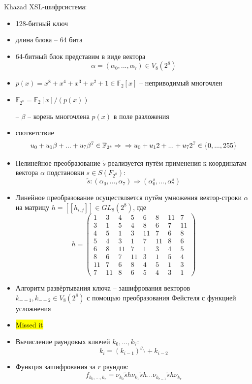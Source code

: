 \documentclass[a4paper,12pt]{article}
\begin{document}
  Khazad XSL-шифрсистема:
  \begin{itemize}
  \item 128-битный ключ
  \item длина блока -- 64 бита
  \end{itemize}
  \begin{itemize}
  \item 64-битный блок представим в виде вектора \[ \alpha = ( \alpha_0, ..., \alpha_7) \in V_8(2^8) \]
  \item $p(x) = x^8 + x^4 + x^3 + x^2 + 1 \in \mathbb{F}_2[x]$ -- неприводимый многочлен
  \item $\mathbb{F}_{2^8} = \mathbb{F}_2[x] / (p(x))$

    -- $\beta$ -- корень многочлена $p(x)$ в поле разложения
  \item соответствие
    \[ u_0 + u_1\beta + ... + u_7\beta^7 \in \mathbb{F}_{2^8} \Rightarrow \\
      \Rightarrow u_0 + u_1 2 + ... + u_7 2^7 \in \{0, ..., 255\} \]
  \item Нелинейное преобразование $\tilde{s}$ реализуется путём
    применения к координатам вектора $\alpha$ подстановки $s \in
    S(F_{2^8})$: \[ \tilde{s}: (\alpha_0, ..., \alpha_7) \Rightarrow
      (\alpha_0^s, ..., \alpha_7^s) \]
  \item Линейное преобразование осуществляется путём умножения
    вектор-строки $\alpha$ на матрицу $h = [[h_{i, j}]] \in
    GL_8(2^8)$, где \[ h =
      \begin{pmatrix}
        1  & 3  & 4  & 5  & 6  & 8  & 11 & 7 \\
        3  & 1  & 5  & 4  & 8  & 6  & 7  & 11 \\
        4  & 5  & 1  & 3  & 11 & 7  & 6  & 8 \\
        5  & 4  & 3  & 1  & 7  & 11 & 8  & 6 \\
        6  & 8  & 11 & 7  & 1  & 3  & 4  & 5 \\
        8  & 6  & 7  & 11 & 3  & 1  & 5  & 4 \\
        11 & 7  & 6  & 8  & 4  & 5  & 1  & 3 \\
        7  & 11 & 8  & 6  & 5  & 4  & 3  & 1
      \end{pmatrix}
      \]
  \item  Алгоритм развёртывания ключа -- зашифрования векторов $k_{--
      1}, k_{-- 2} \in V_8(2^8)$ с помощью преобразования Фейстеля с
    функцией усложнения
  \item \hl{Missed it}
  \item Вычисление раундовых ключей $k_0, ..., k_7$: \[ k_i = (k_{i -
        1})^{g_{c_i}} + k_{i - 2} \]
  \item Функция зашифрования за $r$ раундов:
  \[ f_{k_0, ..., k_r} =
      \nu_{k_0}\tilde{s}h\nu_{k_1}\tilde{s}h ... \nu_{k_{r-1}}\tilde{s}h\nu_{k_r}
  \]
  \end{itemize}
\end{document}
